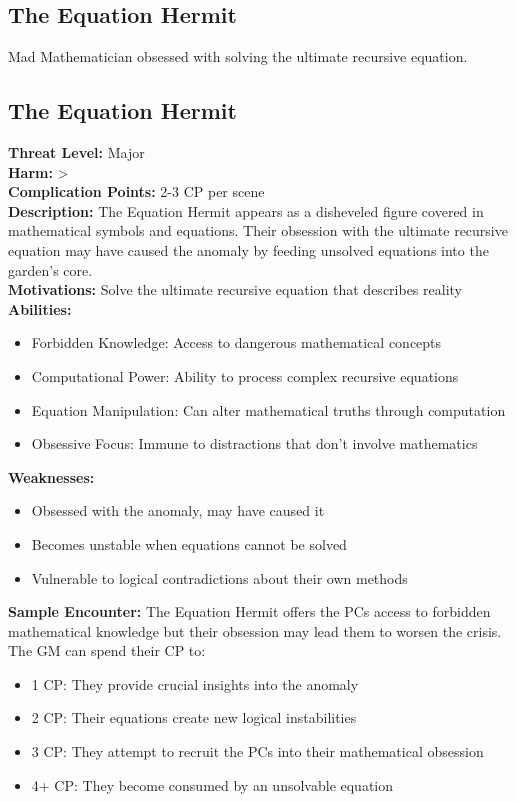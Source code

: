 \documentclass[11pt]{article}
\newenvironment{monsterentry}[1]{%
  \begin{mdframed}[backgroundcolor=shadecolor, linewidth=0pt, leftmargin=0pt, rightmargin=0pt]%
  \subsection*{#1}%
}{%
  \end{mdframed}%
}
\begin{document}
\subsection{The Equation Hermit}

Mad Mathematician obsessed with solving the ultimate recursive equation.

\begin{monsterentry}{The Equation Hermit}
\textbf{Threat Level:} Major \\
\textbf{Harm:} \textgreater \\
\textbf{Complication Points:} 2-3 CP per scene \\
\textbf{Description:} The Equation Hermit appears as a disheveled figure covered in mathematical symbols and equations. Their obsession with the ultimate recursive equation may have caused the anomaly by feeding unsolved equations into the garden's core. \\
\textbf{Motivations:} Solve the ultimate recursive equation that describes reality \\
\textbf{Abilities:}
\begin{itemize}
\item Forbidden Knowledge: Access to dangerous mathematical concepts
\item Computational Power: Ability to process complex recursive equations
\item Equation Manipulation: Can alter mathematical truths through computation
\item Obsessive Focus: Immune to distractions that don't involve mathematics
\end{itemize}
\textbf{Weaknesses:}
\begin{itemize}
\item Obsessed with the anomaly, may have caused it
\item Becomes unstable when equations cannot be solved
\item Vulnerable to logical contradictions about their own methods
\end{itemize}
\textbf{Sample Encounter:} The Equation Hermit offers the PCs access to forbidden mathematical knowledge but their obsession may lead them to worsen the crisis. The GM can spend their CP to:
\begin{itemize}
\item 1 CP: They provide crucial insights into the anomaly
\item 2 CP: Their equations create new logical instabilities
\item 3 CP: They attempt to recruit the PCs into their mathematical obsession
\item 4+ CP: They become consumed by an unsolvable equation
\end{itemize}
\end{monsterentry}
\end{document}
